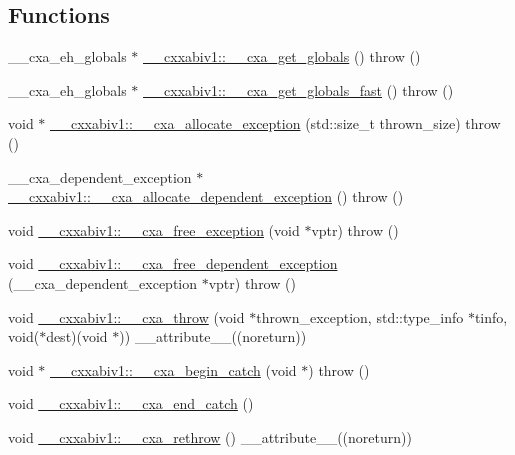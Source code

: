 \subsection*{Functions}
\begin{DoxyCompactItemize}
\item 
\-\_\-\-\_\-cxa\-\_\-eh\-\_\-globals $\ast$ \hyperlink{namespace____cxxabiv1_a4bf3c8fb770500c0ef4e3982856c9196}{\-\_\-\-\_\-cxxabiv1\-::\-\_\-\-\_\-cxa\-\_\-get\-\_\-globals} ()  throw ()
\item 
\-\_\-\-\_\-cxa\-\_\-eh\-\_\-globals $\ast$ \hyperlink{namespace____cxxabiv1_a8f410bff4c6156ad943edda57b60a2ba}{\-\_\-\-\_\-cxxabiv1\-::\-\_\-\-\_\-cxa\-\_\-get\-\_\-globals\-\_\-fast} ()  throw ()
\item 
void $\ast$ \hyperlink{namespace____cxxabiv1_a1bf118309de45a604f6e68d5a30b110a}{\-\_\-\-\_\-cxxabiv1\-::\-\_\-\-\_\-cxa\-\_\-allocate\-\_\-exception} (std\-::size\-\_\-t thrown\-\_\-size)  throw ()
\item 
\-\_\-\-\_\-cxa\-\_\-dependent\-\_\-exception $\ast$ \hyperlink{namespace____cxxabiv1_acf05beb6b38df0079e2baba52f71d799}{\-\_\-\-\_\-cxxabiv1\-::\-\_\-\-\_\-cxa\-\_\-allocate\-\_\-dependent\-\_\-exception} ()  throw ()
\item 
void \hyperlink{namespace____cxxabiv1_a39c21cf41e5c2b153858f295e0c007e2}{\-\_\-\-\_\-cxxabiv1\-::\-\_\-\-\_\-cxa\-\_\-free\-\_\-exception} (void $\ast$vptr)  throw ()
\item 
void \hyperlink{namespace____cxxabiv1_a67567be05afd0965cfcae2ca22f1d7c9}{\-\_\-\-\_\-cxxabiv1\-::\-\_\-\-\_\-cxa\-\_\-free\-\_\-dependent\-\_\-exception} (\-\_\-\-\_\-cxa\-\_\-dependent\-\_\-exception $\ast$vptr)  throw ()
\item 
void \hyperlink{namespace____cxxabiv1_a301675c046ac023f33820493fac3e592}{\-\_\-\-\_\-cxxabiv1\-::\-\_\-\-\_\-cxa\-\_\-throw} (void $\ast$thrown\-\_\-exception, std\-::type\-\_\-info $\ast$tinfo, void($\ast$dest)(void $\ast$)) \-\_\-\-\_\-attribute\-\_\-\-\_\-((noreturn))
\item 
void $\ast$ \hyperlink{namespace____cxxabiv1_a4169d9dfe292e8011c8b7c36b0c1a010}{\-\_\-\-\_\-cxxabiv1\-::\-\_\-\-\_\-cxa\-\_\-begin\-\_\-catch} (void $\ast$)  throw ()
\item 
void \hyperlink{namespace____cxxabiv1_a770a73f25be21598aa6aa1aa8f2ba5e5}{\-\_\-\-\_\-cxxabiv1\-::\-\_\-\-\_\-cxa\-\_\-end\-\_\-catch} ()
\item 
void \hyperlink{namespace____cxxabiv1_a02474e3a539df52d3cb0dae1f50b7a35}{\-\_\-\-\_\-cxxabiv1\-::\-\_\-\-\_\-cxa\-\_\-rethrow} () \-\_\-\-\_\-attribute\-\_\-\-\_\-((noreturn))

\end{DoxyCompactItemize}
